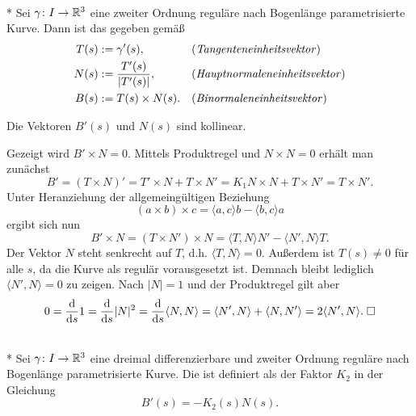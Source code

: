 \begin{definition}%
%
%
\mbox{}\\*
Sei $\gamma\colon I\to\mathbb R^3$ eine zweiter Ordnung reguläre
nach Bogenlänge parametrisierte Kurve. Dann ist das  gegeben gemäß
\begin{align}
T(s) &:= \gamma'(s), && \text{(\emph{Tangenteneinheitsvektor})}\\
N(s) &:= \frac{T'(s)}{|T'(s)|}, && \text{(\emph{Hauptnormaleneinheitsvektor})}\\
B(s) &:= T(s)\times N(s). && \text{(\emph{Binormaleneinheitsvektor})}
\end{align}
\end{definition}

\begin{theorem}\label{Bstrich-kollinear-zu-N}
Die Vektoren $B'(s)$ und $N(s)$ sind kollinear.
\end{theorem}

\noindent{}
Gezeigt wird $B'\times N=0$. Mittels Produktregel und $N\times N=0$
erhält man zunächst%
\begin{equation}
B' = (T\times N)' = T'\times N+T\times N'
= K_1 N\times N + T\times N' = T\times N'.
\end{equation}
Unter Heranziehung der allgemeingültigen Beziehung
\begin{equation}\label{eq:Grassmann-Identitaet}
(a\times b)\times c = \langle a,c\rangle b - \langle b,c\rangle a
\end{equation}
ergibt sich nun
\begin{equation}
B'\times N = (T\times N')\times N
= \langle T,N\rangle N' - \langle N',N\rangle T.
\end{equation}
Der Vektor $N$ steht senkrecht auf $T$, d.h.
$\langle T,N\rangle=0$. Außerdem ist $T(s)\ne 0$ für alle $s$,
da die Kurve als regulär vorausgesetzt ist. Demnach bleibt lediglich
$\langle N',N\rangle=0$ zu zeigen. Nach $|N|=1$ und der Produktregel
gilt aber%
\begin{equation}
0 = \frac{\mathrm d}{\mathrm ds} 1 = \frac{\mathrm d}{\mathrm ds} |N|^2
= \frac{\mathrm d}{\mathrm ds} \langle N,N\rangle
= \langle N',N\rangle + \langle N,N'\rangle
= 2\langle N',N\rangle.\;\Box
\end{equation}


\begin{definition}[Torsion]%
\label{Torsion}\mbox{}\\*
Sei $\gamma\colon I\to\mathbb R^3$ eine dreimal differenzierbare und
zweiter Ordnung reguläre nach Bogenlänge parametrisierte Kurve.
Die  ist definiert als der Faktor $K_2$ in der Gleichung%
\begin{equation}
B'(s) = -K_2(s)N(s).
\end{equation}
\end{definition}

